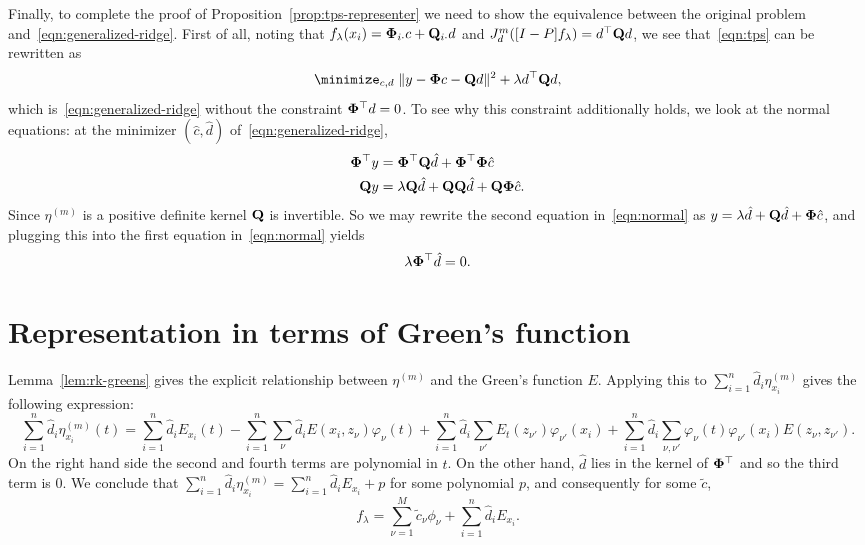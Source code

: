 \documentclass{article}
\newcommand{\wt}[1]{\widetilde{#1}}
\newcommand{\1}{\mathbf{1}}
\begin{document}
Finally, to complete the proof of Proposition~\ref{prop:tps-representer} we need to show the equivalence between the original problem and~\eqref{eqn:generalized-ridge}. First of all, noting that $f_{\lambda}(x_i) = {\bf \Phi}_{i\cdot} c + {\bf Q}_{i \cdot} d$ and $J_d^{m}([I - P]f_{\lambda}) = d^{\top} {\bf Q} d$,  we see that~\eqref{eqn:tps} can be rewritten as 
\begin{equation*}
\minimize_{c,d} \; \|y - {\bf \Phi} c - {\bf Q} d\|^2 + \lambda d^{\top} {\bf Q} d,
\end{equation*}
which is~\eqref{eqn:generalized-ridge} without the constraint ${\bf \Phi}^{\top}d = 0$. To see why this constraint additionally holds, we look at the normal equations: at the minimizer $(\hat{c},\hat{d})$ of~\eqref{eqn:generalized-ridge},
\begin{equation}
\label{eqn:normal}
\begin{aligned}
{\bf \Phi}^{\top} y &=  {\bf \Phi}^{\top} {\bf Q} \hat{d} + {\bf \Phi}^{\top} {\bf \Phi} \hat{c} \\
{\bf Q} y & = \lambda {\bf Q} \hat{d}  + {\bf Q}{\bf Q} \hat{d} + {\bf Q} {\bf \Phi} \hat{c}.
\end{aligned}
\end{equation}
Since $\eta^{(m)}$ is a positive definite kernel ${\bf Q}$ is invertible. So we may rewrite the second equation in~\eqref{eqn:normal} as $y = \lambda \hat{d} + {\bf Q} \hat{d} + {\bf \Phi} \hat{c}$, and plugging this into the first equation in~\eqref{eqn:normal} yields
\begin{equation*}
\lambda {\bf \Phi}^{\top} \hat{d} = 0.
\end{equation*}

\section{Representation in terms of Green's function}
Lemma~\ref{lem:rk-greens} gives the explicit relationship between $\eta^{(m)}$ and the Green's function $E$. Applying this to $\sum_{i = 1}^{n} \hat{d}_i \eta_{x_i}^{(m)}$ gives the following expression:
\begin{equation*}
\sum_{i = 1}^{n} \hat{d}_i \eta_{x_i}^{(m)}(t) = \sum_{i = 1}^{n} \hat{d}_i E_{x_i}(t) - \sum_{i = 1}^{n} \sum_{\nu} \hat{d}_i E(x_i,z_{\nu}) \varphi_{\nu}(t) + \sum_{i = 1}^{n} \hat{d}_i \sum_{\nu'} E_{t}(z_{\nu'}) \varphi_{\nu'}(x_i) + \sum_{i = 1}^{n} \hat{d}_i \sum_{\nu,\nu'} \varphi_{\nu}(t) \varphi_{\nu'}(x_i) E(z_{\nu},z_{\nu'}).
\end{equation*}
On the right hand side the second and fourth terms are polynomial in $t$. On the other hand, $\hat{d}$ lies in the kernel of ${\bf \Phi}^{\top}$ and so the third term is $0$. We conclude that $\sum_{i = 1}^{n} \hat{d}_i \eta_{x_i}^{(m)} = \sum_{i = 1}^{n} \hat{d}_i E_{x_i} + p$ for some polynomial $p$, and consequently for some $\wt{c}$,
\begin{equation}
\label{pf:thm1-1}
f_{\lambda} = \sum_{\nu = 1}^{M} \tilde{c}_{\nu} \phi_{\nu} + \sum_{i = 1}^{n} \hat{d}_i E_{x_i}.
\end{equation}
\end{document}
